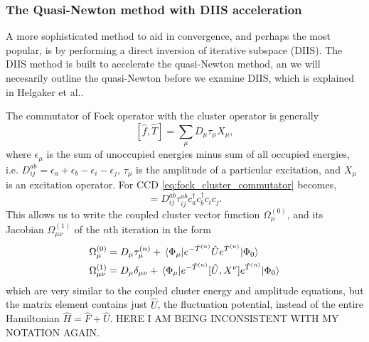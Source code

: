     


    \subsubsection{The Quasi-Newton method with DIIS acceleration}

    A more sophisticated method to aid in convergence, and perhaps the most popular,
    is by performing a direct inversion of iterative subspace (DIIS). The DIIS method 
    is built to accelerate the quasi-Newton method, an we will necesarily outline the 
    quasi-Newton before we examine DIIS, which is explained in Helgaker et 
    al.\cite{helgaker2014molecular}.

    The commutator of Fock operator with the cluster operator is generally
    \begin{equation}
        \label{eq:fock_cluster_commutator}
        [\hat{f}, \hat{T}] = \sum_\mu D_\mu \tau_\mu X_\mu,
    \end{equation}
    where $\epsilon_\mu$ is the sum of unoccupied energies minus sum of all 
    occupied energies, i.e. $D^{ab}_{ij} = \epsilon_a  + \epsilon_b - \epsilon_i - \epsilon_j$,
    $\tau_\mu$ is the amplitude of a particular excitation, and $X_\mu$ is an excitation 
    operator. For CCD \autoref{eq:fock_cluster_commutator} becomes,
    \begin{equation}
        [\hat{f}, \hat{T}_2] = D^{ab}_{ij} \tau^{ab}_{ij} c^\dagger_a c^\dagger_b c_i c_j.
    \end{equation}
    This allows us to write the coupled cluster vector function $\Omega^{(0)}_\mu$,
    and its Jacobian $\Omega^{(1)}_{\mu\nu}$ of the $n$th iteration in the form 
    \begin{align}
        \label{eq:vector_function_diis}
        \Omega^{(0)}_\mu &= D_\mu \tau^{(n)}_\mu 
            + \mel{\Phi_\mu}
            {e^{-\hat{T}^{(n)}} \hat{U} e^{\hat{T}^{(n)}}}
            {\Phi_0} \\
        \label{eq:jacobian_diis}
        \Omega^{(1)}_{\mu\nu} &= D_\mu\delta_{\mu\nu} 
            + \mel{\Phi_\mu}
            {e^{-\hat{T}^{(n)}} [\hat{U}, X^\nu] e^{\hat{T}^{(n)}}}
            {\Phi_0}
    \end{align}
    which are very similar to the coupled cluster energy and amplitude equations, but 
    the matrix element contains just $\hat{U}$, the fluctuation potential, instead of 
    the entire Hamiltonian $\hat{H} = \hat{F} + \hat{U}$. HERE I AM BEING INCONSISTENT
    WITH MY NOTATION AGAIN.

